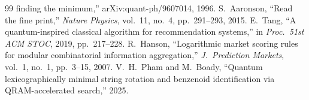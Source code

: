 \documentclass[11pt]{article}
\theoremstyle{definition}
\begin{document}
\begin{thebibliography}{99}
  finding the minimum,'' arXiv:quant-ph/9607014, 1996.
 S.~Aaronson, ``Read the fine print,'' \emph{Nature
  Physics}, vol.~11, no.~4, pp.~291--293, 2015.
 E.~Tang, ``A quantum-inspired classical algorithm
  for recommendation systems,'' in \emph{Proc.\ 51st ACM STOC}, 2019, pp.~217--228.
 R.~Hanson, ``Logarithmic market scoring rules for modular
  combinatorial information aggregation,'' \emph{J.\ Prediction Markets}, vol.~1,
  no.~1, pp.~3--15, 2007.
 V.~H.~Pham and M.~Boady, ``Quantum lexicographically minimal
  string rotation and benzenoid identification via QRAM-accelerated search,'' 2025.
\end{thebibliography}
\end{document}
